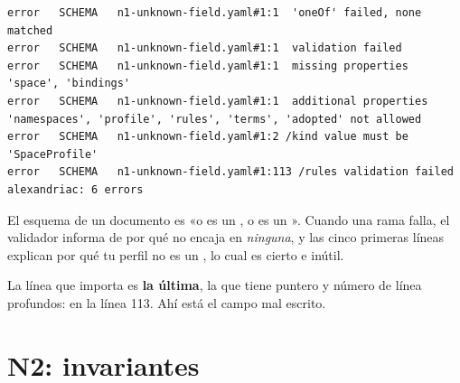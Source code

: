 \begin{lstlisting}[style=out]
error   SCHEMA   n1-unknown-field.yaml#1:1  'oneOf' failed, none matched
error   SCHEMA   n1-unknown-field.yaml#1:1  validation failed
error   SCHEMA   n1-unknown-field.yaml#1:1  missing properties 'space', 'bindings'
error   SCHEMA   n1-unknown-field.yaml#1:1  additional properties 'namespaces', 'profile', 'rules', 'terms', 'adopted' not allowed
error   SCHEMA   n1-unknown-field.yaml#1:2 /kind value must be 'SpaceProfile'
error   SCHEMA   n1-unknown-field.yaml#1:113 /rules validation failed
alexandriac: 6 errors
\end{lstlisting}

\begin{trampaHabitual}
El esquema de un documento es «o es un , o es un ». Cuando una rama falla, el
validador informa de por qué no encaja en \emph{ninguna}, y las cinco primeras líneas explican por qué tu perfil
no es un , lo cual es cierto e inútil.

La línea que importa es \textbf{la última}, la que tiene puntero y número de línea profundos:  en la
línea 113. Ahí está el campo mal escrito.
\end{trampaHabitual}

\section{N2: invariantes}

